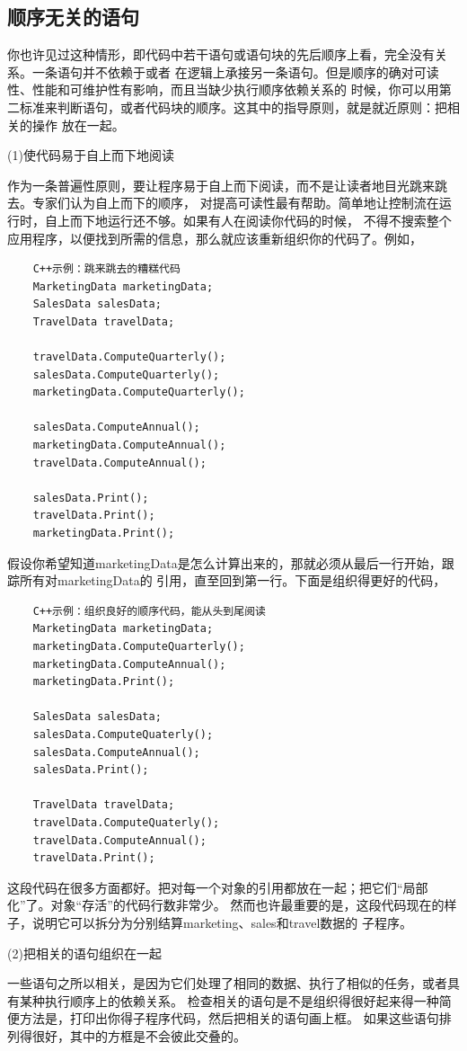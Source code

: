 \documentclass{article}
\begin{document}
\subsection{顺序无关的语句}
你也许见过这种情形，即代码中若干语句或语句块的先后顺序上看，完全没有关系。一条语句并不依赖于或者
在逻辑上承接另一条语句。但是顺序的确对可读性、性能和可维护性有影响，而且当缺少执行顺序依赖关系的
时候，你可以用第二标准来判断语句，或者代码块的顺序。这其中的指导原则，就是就近原则：把相关的操作
放在一起。
\par
(1)使代码易于自上而下地阅读
\par
作为一条普遍性原则，要让程序易于自上而下阅读，而不是让读者地目光跳来跳去。专家们认为自上而下的顺序，
对提高可读性最有帮助。简单地让控制流在运行时，自上而下地运行还不够。如果有人在阅读你代码的时候，
不得不搜索整个应用程序，以便找到所需的信息，那么就应该重新组织你的代码了。例如，
\begin{lstlisting}
    C++示例：跳来跳去的糟糕代码
    MarketingData marketingData;
    SalesData salesData;
    TravelData travelData;

    travelData.ComputeQuarterly();
    salesData.ComputeQuarterly();
    marketingData.ComputeQuarterly();

    salesData.ComputeAnnual();
    marketingData.ComputeAnnual();
    travelData.ComputeAnnual();

    salesData.Print();
    travelData.Print();
    marketingData.Print();
\end{lstlisting}
假设你希望知道marketingData是怎么计算出来的，那就必须从最后一行开始，跟踪所有对marketingData的
引用，直至回到第一行。下面是组织得更好的代码，
\begin{lstlisting}
    C++示例：组织良好的顺序代码，能从头到尾阅读
    MarketingData marketingData;
    marketingData.ComputeQuarterly();
    marketingData.ComputeAnnual();
    marketingData.Print();

    SalesData salesData;
    salesData.ComputeQuaterly();
    salesData.ComputeAnnual();
    salesData.Print();

    TravelData travelData;
    travelData.ComputeQuaterly();
    travelData.ComputeAnnual();
    travelData.Print();
\end{lstlisting}
这段代码在很多方面都好。把对每一个对象的引用都放在一起；把它们“局部化”了。对象“存活”的代码行数非常少。
然而也许最重要的是，这段代码现在的样子，说明它可以拆分为分别结算marketing、sales和travel数据的
子程序。

\par
(2)把相关的语句组织在一起
\par
一些语句之所以相关，是因为它们处理了相同的数据、执行了相似的任务，或者具有某种执行顺序上的依赖关系。
检查相关的语句是不是组织得很好起来得一种简便方法是，打印出你得子程序代码，然后把相关的语句画上框。
如果这些语句排列得很好，其中的方框是不会彼此交叠的。
\end{document}
